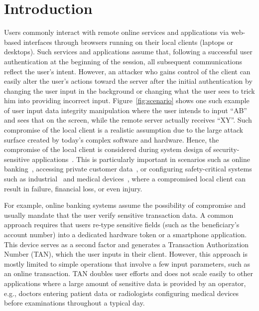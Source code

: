 \section{Introduction}
\label{sec:intro}

Users commonly interact with remote online services and applications via web-based interfaces through browsers running on their local clients (laptops or desktops). Such services and applications assume that, following a successful user authentication at the beginning of the session, all subsequent communications reflect the user's intent. However, an attacker who gains control of the client can easily alter the user's actions toward the server after the initial authentication by changing the user input in the background or changing what the user sees to trick him into providing incorrect input. Figure~\ref{fig:scenario} shows one such example of user input data integrity manipulation where the user intends to input ``AB'' and sees that on the screen, while the remote server actually receives ``XY''. Such compromise of the local client is a realistic assumption due to the large attack surface created by today's complex software and hardware. Hence, the compromise of the local client is considered during system design of security-sensitive applications~\cite{EUAgencyAssumeHostCompromised}. This is particularly important in scenarios such as online banking~\cite{binsalleeh2010analysis}, accessing private customer data~\cite{uberHack}, or %
configuring safety-critical systems such as industrial~\cite{sadeghi2015security} and medical devices~\cite{ImplantsSecurity}, where a compromised local client can result in failure, financial loss, or even injury.


For example, online banking systems assume the possibility of compromise and usually mandate that the user verify sensitive transaction data.
A common approach requires that users re-type sensitive fields (such as the beneficiary's account number) into a dedicated hardware token or a smartphone application.
This device serves as a second factor and generates a Transaction Authorization Number (TAN), which the user inputs in their client. %
However, this approach is mostly limited to simple operations that involve a few input parameters, such as an online transaction. TAN doubles user efforts and does not scale easily to other applications where a large amount of sensitive data is provided by an operator, e.g., doctors entering patient data or radiologists configuring medical devices before examinations throughout a typical day.

